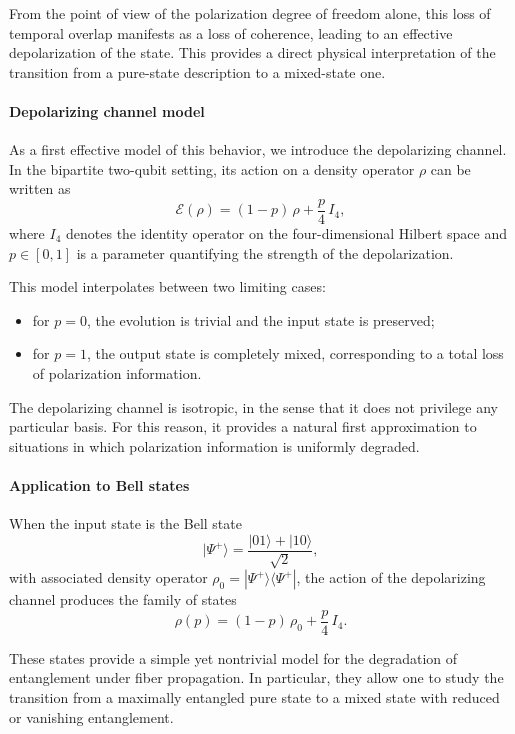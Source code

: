 \documentclass[a4paper]{article}
\begin{document}
\medskip

From the point of view of the polarization degree of freedom alone, this loss of temporal overlap manifests as a loss of coherence, leading to an effective depolarization of the state. This provides a direct physical interpretation of the transition from a pure-state description to a mixed-state one.

\paragraph{Depolarizing channel model}

As a first effective model of this behavior, we introduce the depolarizing channel. In the bipartite two-qubit setting, its action on a density operator \(\rho\) can be written as
\[
\mathcal{E}(\rho)
=
(1 - p)\,\rho
+
\frac{p}{4}\, I_4,
\]
where \(I_4\) denotes the identity operator on the four-dimensional Hilbert space and \(p \in [0,1]\) is a parameter quantifying the strength of the depolarization.

\medskip

This model interpolates between two limiting cases:

\begin{itemize}
    \item for \(p = 0\), the evolution is trivial and the input state is preserved;
    \item for \(p = 1\), the output state is completely mixed, corresponding to a total loss of polarization information.
\end{itemize}

The depolarizing channel is isotropic, in the sense that it does not privilege any particular basis. For this reason, it provides a natural first approximation to situations in which polarization information is uniformly degraded.

\paragraph{Application to Bell states}

When the input state is the Bell state
\[
|\Psi^+\rangle = \frac{|01\rangle + |10\rangle}{\sqrt{2}},
\]
with associated density operator \(\rho_0 = |\Psi^+\rangle\langle\Psi^+|\), the action of the depolarizing channel produces the family of states
\[
\rho(p)
=
(1 - p)\,\rho_0
+
\frac{p}{4}\, I_4.
\]

These states provide a simple yet nontrivial model for the degradation of entanglement under fiber propagation. In particular, they allow one to study the transition from a maximally entangled pure state to a mixed state with reduced or vanishing entanglement.
\end{document}
